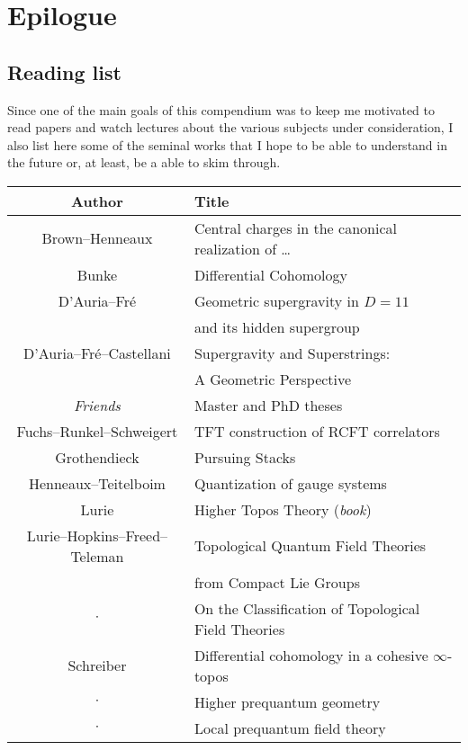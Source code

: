 \chapter{Epilogue}

\section{Reading list}

    Since one of the main goals of this compendium was to keep me motivated to read papers and watch lectures about the various subjects under consideration, I also list here some of the seminal works that I hope to be able to understand in the future or, at least, be a able to skim through.

    \begin{center}
        \begin{tabular}{|c|l|}
            \hline
            Author&Title\\
            \hline
            Brown--Henneaux&Central charges in the canonical realization of \ldots\\
            Bunke&Differential Cohomology\\
            D'Auria--Fr\'e&Geometric supergravity in $D=11$\\
            &\qquad and its hidden supergroup\\
            D'Auria--Fr\'e--Castellani&Supergravity and Superstrings:\\
            &\qquad A Geometric Perspective\\
            \textit{Friends}&Master and PhD theses\\
            Fuchs--Runkel--Schweigert&TFT construction of RCFT correlators\\
            Grothendieck&Pursuing Stacks\\
            Henneaux--Teitelboim&Quantization of gauge systems\\
            Lurie&Higher Topos Theory (\textit{book})\\
            Lurie--Hopkins--Freed--Teleman&Topological Quantum Field Theories\\
            &\qquad from Compact Lie Groups\\
            $\cdot$&On the Classification of Topological Field Theories\\
            Schreiber&Differential cohomology in a cohesive $\infty$-topos\\
            $\cdot$&Higher prequantum geometry\\
            $\cdot$&Local prequantum field theory\\
            \hline
        \end{tabular}
    \end{center}

